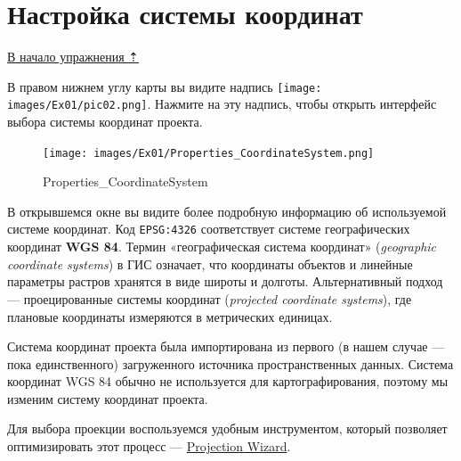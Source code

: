 \documentclass[
  12pt,
]{book}
\begin{document}
\hypertarget{map-design-general-projection}{%
\section{Настройка системы координат}\label{map-design-general-projection}}

\protect\hyperlink{map-design-general}{В начало упражнения ⇡}

В правом нижнем углу карты вы видите надпись \texttt{[image: images/Ex01/pic02.png]}. Нажмите на эту надпись, чтобы открыть интерфейс выбора системы координат проекта.

\begin{figure}
\centering
\texttt{[image: images/Ex01/Properties\_CoordinateSystem.png]}
\caption{Properties\_CoordinateSystem}
\end{figure}

В открывшемся окне вы видите более подробную информацию об используемой системе координат. Код \texttt{EPSG:4326} соответствует системе географических координат \textbf{WGS 84}. Термин «географическая система координат» (\emph{geographic coordinate systems}) в ГИС означает, что координаты объектов и линейные параметры растров хранятся в виде широты и долготы. Альтернативный подход --- проецированные системы координат (\emph{projected coordinate systems}), где плановые координаты измеряются в метрических единицах.

Система координат проекта была импортирована из первого (в нашем случае --- пока единственного) загруженного источника пространственных данных. Система координат WGS 84 обычно не используется для картографирования, поэтому мы изменим систему координат проекта.

Для выбора проекции воспользуемся удобным инструментом, который позволяет оптимизировать этот процесс --- \href{http://projectionwizard.org/}{Projection Wizard}.
\end{document}
